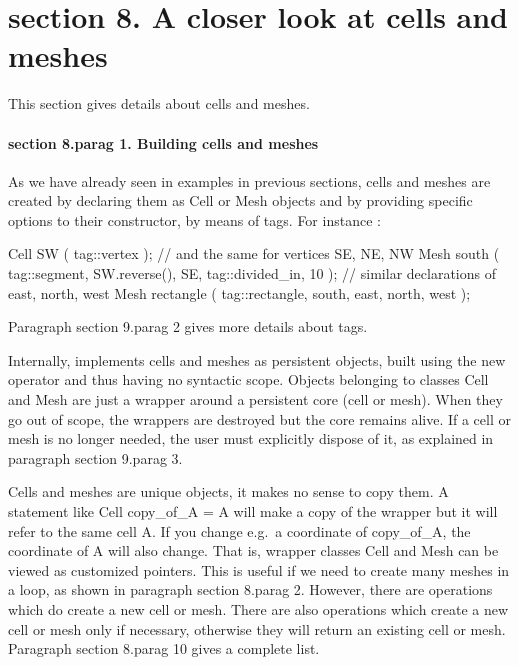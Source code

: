 \section{\numb section 8. A closer look at cells and meshes}

This section gives details about cells and meshes.


\paragraph{\numb section 8.\numb parag 1. Building cells and meshes}

As we have already seen in examples in previous sections, cells and meshes are created
by declaring them as {\codett Cell} or {\codett Mesh} objects and by providing specific
options to their constructor, by means of {\codett tag}s. For instance :

\verbatim
   Cell SW ( tag::vertex ); // and the same for vertices SE, NE, NW
   Mesh south ( tag::segment, SW.reverse(), SE, tag::divided_in, 10 );
   // similar declarations of east, north, west
   Mesh rectangle ( tag::rectangle, south, east, north, west );
\endverbatim

Paragraph \numb section 9.\numb parag 2 gives more details about {\codett tag}s.

Internally, {\maniFEM} implements cells and meshes as persistent objects, built
using the {\codett new} operator and thus having no syntactic scope.
Objects belonging to classes {\codett Cell} and {\codett Mesh} are just a wrapper
around a persistent core (cell or mesh).
When they go out of scope, the wrappers are destroyed but the core remains alive.
If a cell or mesh is no longer needed, the user must explicitly dispose of it,
as explained in paragraph \numb section 9.\numb parag 3.

Cells and meshes are unique objects, it makes no sense to copy them.
A statement like {\codett Cell copy\_of\_A = A} will make a copy of the wrapper
but it will refer to the same cell {\codett A}.
If you change e.g.\ a coordinate of {\codett copy\_of\_A}, the coordinate of {\codett A}
will also change.
That is, wrapper classes {\codett Cell} and {\codett Mesh} can be viewed as
customized pointers.
This is useful if we need to create many meshes in a loop, as shown in paragraph
\numb section 8.\numb parag 2.
However, there are operations which do create a new cell or mesh.
There are also operations which create a new cell or mesh only if necessary,
otherwise they will return an existing cell or mesh.
Paragraph \numb section 8.\numb parag 10 gives a complete list.

